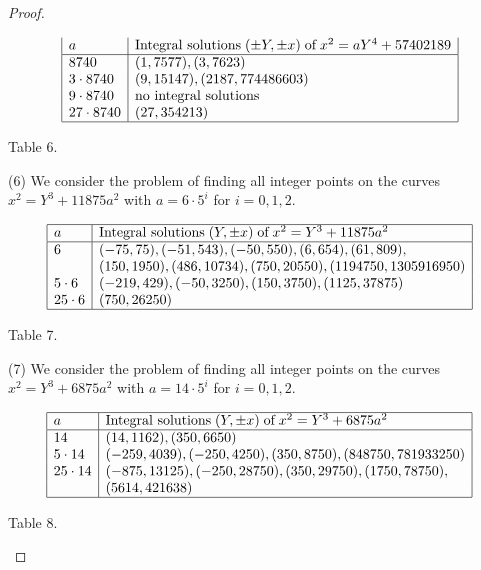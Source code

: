 \documentclass[10pt]{amsart}
\theoremstyle{plain}
\begin{document}
\begin{proof}
\begin{center}
\begin{equation*}
\begin{array}{|l|l|}
  a          & \mbox{Integral solutions}\;(\pm Y, \pm x)\;\mbox{of}\;x^2=aY^4+57402189  \\
  \hline
  8740          & (1, 7577), (3, 7623)\\
  3\cdot 8740   & (9, 15147), (2187, 774486603)\\
  9\cdot 8740   & \mbox{no integral solutions} \\
  27\cdot 8740  & (27, 354213)\\
   \hline
\end{array}
\end{equation*}
\end{center}
\begin{center}
Table 6.
\end{center}

(6) We consider the problem of finding all integer points on the curves $x^2=Y^3+11875a^2$ with $a=6\cdot 5^{i}$ for $i=0,1,2$.
\begin{center}
\begin{equation*}
\begin{array}{|l|l|}
  \hline
  
  a          & \mbox{Integral solutions}\;(Y, \pm x)\;\mbox{of}\;x^2=Y^3+11875a^2  \\
  \hline
  6          & (-75, 75), (-51, 543), (-50, 550), (6, 654), (61, 809), \\
                   & (150, 1950), (486, 10734), (750,  20550), (1194750, 1305916950)\\
  5\cdot 6   & (-219, 429), (-50, 3250), (150, 3750), (1125, 37875)\\
  25\cdot 6  &  (750, 26250)\\
   \hline
\end{array}
\end{equation*}
\end{center}
\begin{center}
Table 7.
\end{center}

(7) We consider the problem of finding all integer points on the curves $x^2=Y^3+6875a^2$ with $a=14\cdot 5^{i}$ for $i=0,1,2$.
\begin{center}
\begin{equation*}
\begin{array}{|l|l|}
  \hline
  
  a          & \mbox{Integral solutions}\;(Y, \pm x)\;\mbox{of}\;x^2=Y^3+6875a^2  \\
  \hline
  14          & (14, 1162), (350, 6650)\\
  5\cdot 14   & (-259, 4039), (-250, 4250), (350, 8750), (848750, 781933250)\\
  25\cdot 14  & (-875, 13125), (-250, 28750), (350, 29750), (1750, 78750), \\
                &(5614, 421638)\\
   \hline
\end{array}
\end{equation*}
\end{center}
\begin{center}
Table 8.
\end{center}


\end{proof}
\end{document}
